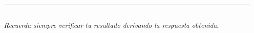 \documentclass[12pt, letterpaper]{article}
\begin{document}
\vspace{8pt}

\begin{center}
  \color{mwprimario}\rule{0.55\linewidth}{0.8pt}\\[4pt]
  \small\color{gray}
  \textit{Recuerda siempre verificar tu resultado derivando la respuesta obtenida.}
\end{center}

\fi
\end{document}
